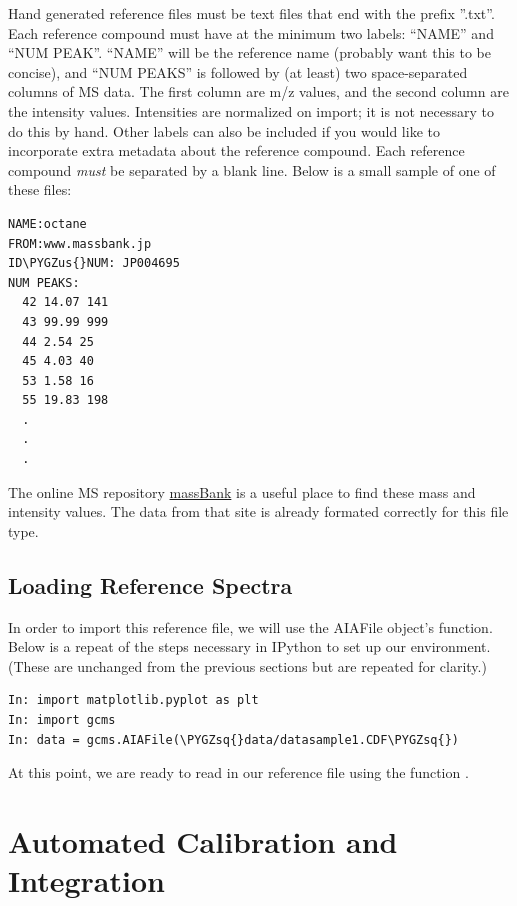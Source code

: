 \documentclass[letterpaper,10pt,english]{sphinxmanual}
\def\PYGZus{\char`\_}
\def\PYGZsq{\char`\'}
\begin{document}
Hand generated reference files must be text files that end with the prefix
''.txt''. Each reference compound must have at the minimum two labels: ``NAME''
and ``NUM PEAK''. ``NAME'' will be the reference name (probably want this to be
concise), and ``NUM PEAKS'' is followed by (at least) two space-separated
columns of MS data. The first column are m/z values, and the second column
are the intensity values. Intensities are normalized on import;
it is not necessary to do this by hand. Other labels can also be included if
you would like to incorporate extra metadata about the reference compound.
Each reference compound \emph{must} be separated by a blank line. Below is a small
sample of one of these files:

\begin{Verbatim}[commandchars=\\\{\}]
NAME:octane
FROM:www.massbank.jp
ID\PYGZus{}NUM: JP004695
NUM PEAKS:
  42 14.07 141
  43 99.99 999
  44 2.54 25
  45 4.03 40
  53 1.58 16
  55 19.83 198
  .
  .
  .
\end{Verbatim}

The online MS repository \href{http://www.massbank.jp/?lang=en}{massBank} is a useful place to find these mass and
intensity values. The data from that site is already formated correctly for
this file type.


\section{Loading Reference Spectra}
\label{fitting:massbank}\label{fitting:loading-reference-spectra}
In order to import this reference file, we will use the AIAFile object's
 function. Below is a repeat of the steps necessary in IPython to
set up our environment. (These are unchanged from the previous sections but are
repeated for clarity.)

\begin{Verbatim}[commandchars=\\\{\}]
In: import matplotlib.pyplot as plt
In: import gcms
In: data = gcms.AIAFile(\PYGZsq{}data/datasample1.CDF\PYGZsq{})
\end{Verbatim}

At this point, we are ready to read in our reference file using the function
.


\chapter{Automated Calibration and Integration}
\label{calibration::doc}\label{calibration:automated-calibration-and-integration}
\end{document}
